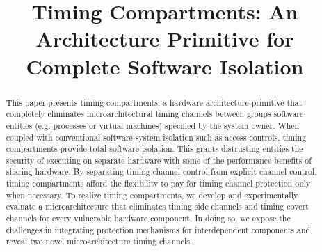 \title{
\vspace{-0.1in}
    Timing Compartments: An Architecture Primitive for Complete Software 
    Isolation
}



\date{}
\maketitle

\thispagestyle{empty}

\begin{abstract}
    This paper presents timing compartments, a hardware architecture primitive 
    that completely eliminates microarchitectural timing channels between 
    groups software entities (e.g. processes or virtual machines) specified by 
    the system owner. When coupled with conventional software system isolation 
    such as access controls, timing compartments provide total software 
    isolation. This grants distrusting entities the security of executing on 
    separate hardware with some of the performance benefits of sharing 
    hardware. By separating timing channel control from explicit channel 
    control, timing compartments afford the flexibility to pay for timing 
    channel protection only when necessary. To realize timing compartments, we 
    develop and experimentally evaluate a microarchitecture that eliminates 
    timing side channels and timing covert channels for every vulnerable 
    hardware component. In doing so, we expose the challenges in integrating 
    protection mechanisms for interdependent components and reveal two novel 
    microarchitecture timing channels. 

\end{abstract}
